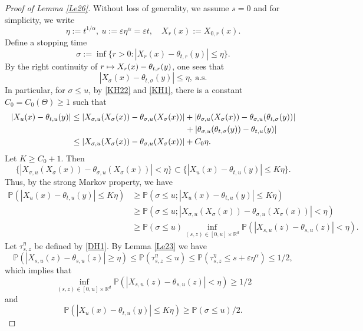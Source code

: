 \documentclass[11pt]{article}
\numberwithin{equation}{section}\providecommand{\asymp}{\mathrel{\sim}}
\def\mto{\mathchoice{\longmapsto}{\mapsto}{\mapsto}{\mapsto}}
\theoremstyle{plain}
\theoremstyle{definition}
\let\eps\varepsilon
\newcommand\mP{\mathbb{P}}
\newcommand\mR{\mathbb{R}}
\newcommand\1{{\mathbf{1}}}
\begin{document}
\begin{proof}[Proof of Lemma \ref{Le26}]
Without loss of generality, we assume $s=0$ and for simplicity, we write
\[
\eta:=t^{1/\alpha},\ u:=\eps\eta^\alpha=\eps t,\quad X_r(x):=X_{0,r}(x).
\]
Define a stopping time
\[
\sigma:=\inf\bigl\{r>0: |X_{r}(x)-\theta_{t,r}(y)|\leq \eta\bigr\}.
\]
By the right continuity of $r\mto X_{r}(x)-\theta_{t,r}(y)$, one sees that
\[
|X_{\sigma}(x)-\theta_{t,\sigma}(y)|\leq \eta, \ \text{a.s.}
\]
In particular, for $\sigma\leq u$, by \eqref{KH22} and \eqref{KH1}, there is a constant $C_0=C_0(\Theta)\geq 1$ such that
\begin{align*}
|X_{u}(x)-\theta_{t,u}(y)|
&\leq |X_{\sigma,u}(X_{\sigma}(x))-\theta_{\sigma,u}(X_{\sigma}(x))|
+|\theta_{\sigma,u}(X_{\sigma}(x))-\theta_{\sigma,u}(\theta_{t,\sigma}(y))|
\\&\hspace*{4.87cm}+|\theta_{\sigma,u}(\theta_{t,\sigma}(y))-\theta_{t,u}(y)|
\\&\leq |X_{\sigma,u}(X_{\sigma}(x))-\theta_{\sigma,u}(X_{\sigma}(x))|+C_0\eta.
\end{align*}
Let $K\geq C_0+1$. Then
\[
\big\{|X_{\sigma,u}(X_{\sigma}(x))-\theta_{\sigma,u}(X_{\sigma}(x))|<\eta\big\}
\subset\big\{|X_{u}(x)-\theta_{t,u}(y)|\leq K\eta\big\}.
\]
Thus, by the strong Markov property, we have
\begin{align*}
\mP(|X_{u}(x)-\theta_{t,u}(y)|\leq K\eta)
&\geq \mP(\sigma\leq u; |X_{u}(x)-\theta_{t,u}(y)|\leq K\eta)
\\&\geq \mP(\sigma\leq u; |X_{\sigma,u}(X_{\sigma}(x))-\theta_{\sigma,u}(X_{\sigma}(x))|<\eta)
\\&\geq \mP(\sigma\leq u)\inf_{(s,z)\in[0,u]\times\mR^d}\mP(|X_{s,u}(z)-\theta_{s,u}(z)|<\eta).
\end{align*}
Let $\tau^\eta_{s,z}$ be defined by \eqref{DH1}.
By Lemma \ref{Le23} we have
\begin{equation}\label{Tau}
\mP\left(|X_{s,u}(z)-\theta_{s,u}(z)|\geq \eta\right)\leq \mP(\tau^\eta_{s,z}\leq u)
\leq \mP(\tau^\eta_{s,z}\leq s+\eps\eta^\alpha)\leq 1/2,
\end{equation}
which implies that
\begin{equation*}
\inf_{(s,z)\in[0,u]\times\mR^d}\mP\left(|X_{s,u}(z)-\theta_{s,u}(z)|<\eta\right)\geq 1/2
\end{equation*}
and
\begin{equation}\label{AA9}
\mP(|X_{u}(x)-\theta_{t,u}(y)|\leq K\eta)\geq \mP(\sigma\leq u)/2.
\end{equation}

\end{proof}
\end{document}
